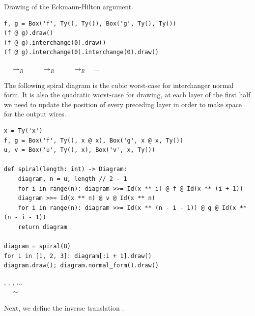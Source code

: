\begin{example}
{\normalfont Drawing of the Eckmann-Hilton argument.}

\begin{verbatim}
f, g = Box('f', Ty(), Ty()), Box('g', Ty(), Ty())
(f @ g).draw()
(f @ g).interchange(0).draw()
(f @ g).interchange(0).interchange(0).draw()
\end{verbatim}

\begin{center}
$\quad \to_R \quad$ 
$\quad \to_R \quad$ 
$\quad \to_R \quad \dots$
\end{center}
\end{example}

\begin{example}\label{example:spiral}
The following spiral diagram is the cubic worst-case for interchanger normal form.
It is also the quadratic worst-case for drawing, at each layer of the first half we need to update the position of every preceding layer in order to make space for the output wires.

\begin{verbatim}
x = Ty('x')
f, g = Box('f', Ty(), x @ x), Box('g', x @ x, Ty())
u, v = Box('u', Ty(), x), Box('v', x, Ty())

def spiral(length: int) -> Diagram:
    diagram, n = u, length // 2 - 1
    for i in range(n): diagram >>= Id(x ** i) @ f @ Id(x ** (i + 1))
    diagram >>= Id(x ** n) @ v @ Id(x ** n)
    for i in range(n): diagram >>= Id(x ** (n - i - 1)) @ g @ Id(x ** (n - i - 1))
    return diagram

diagram = spiral(8)
for i in [1, 2, 3]: diagram[:i + 1].draw()
diagram.draw(); diagram.normal_form().draw()
\end{verbatim}
\begin{center}
,
,
, ... \\
\vspace{5pt}
 $\quad \sim \quad$ 
\end{center}
\end{example}

Next, we define the inverse translation .

